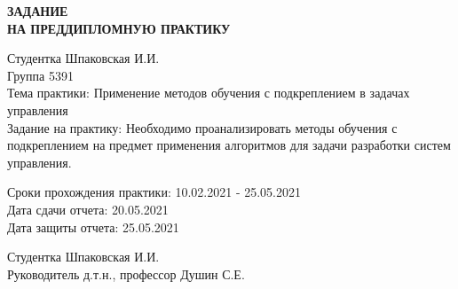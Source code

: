 \newpage

	\begin{center}
		\textbf{ЗАДАНИЕ \\ НА ПРЕДДИПЛОМНУЮ ПРАКТИКУ}\\
	\end{center}

\hfill \break
Студентка Шпаковская И.И.\\
Группа 5391\\
Тема практики: Применение методов обучения с подкреплением в задачах \\
управления \\
Задание на практику: Необходимо проанализировать методы обучения с подкреплением на предмет применения алгоритмов для задачи разработки систем управления.\\
%
\vspace{10cm}
\begin{flushleft}
Сроки прохождения практики: 10.02.2021 - 25.05.2021 \\
Дата сдачи отчета: 20.05.2021 \\
Дата защиты отчета: 25.05.2021 \\
\end{flushleft}
\vspace{1cm}
\begin{flushleft}
 Студентка \hspace{6cm} \underline{\hspace{3cm}} \hspace{1cm}  Шпаковская И.И. \\ 
 \vspace{5mm}
 Руководитель \hspace{0,5cm} д.т.н., профессор \hspace{1cm} \underline{\hspace{3cm}}\hspace{1cm}  Душин С.Е.\\ 
\end{flushleft}

\thispagestyle{empty} %
